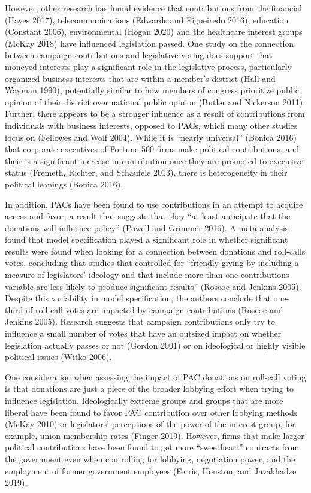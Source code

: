 \documentclass[12pt,]{article}
\begin{document}
However, other research has found evidence that contributions from the
financial (Hayes 2017), telecommunications (Edwards and Figueiredo
2016), education (Constant 2006), environmental (Hogan 2020) and the
healthcare interest groups (McKay 2018) have influenced legislation
passed. One study on the connection between campaign contributions and
legislative voting does support that moneyed interests play a
significant role in the legislative process, particularly organized
business interests that are within a member's district (Hall and Wayman
1990), potentially similar to how members of congress prioritize public
opinion of their district over national public opinion (Butler and
Nickerson 2011). Further, there appears to be a stronger influence as a
result of contributions from individuals with business interests,
opposed to PACs, which many other studies focus on (Fellowes and Wolf
2004). While it is ``nearly universal'' (Bonica 2016) that corporate
executives of Fortune 500 firms make political contributions, and their
is a significant increase in contribution once they are promoted to
executive status (Fremeth, Richter, and Schaufele 2013), there is
heterogeneity in their political leanings (Bonica 2016).

In addition, PACs have been found to use contributions in an attempt to
acquire access and favor, a result that suggests that they ``at least
anticipate that the donations will influence policy'' (Powell and
Grimmer 2016). A meta-analysis found that model specification played a
significant role in whether significant results were found when looking
for a connection between donations and roll-calls votes, concluding that
studies that controlled for ``friendly giving by including a measure of
legislators' ideology and that include more than one contributions
variable are less likely to produce significant results'' (Roscoe and
Jenkins 2005). Despite this variability in model specification, the
authors conclude that one-third of roll-call votes are impacted by
campaign contributions (Roscoe and Jenkins 2005). Research suggests that
campaign contributions only try to influence a small number of votes
that have an outsized impact on whether legislation actually passes or
not (Gordon 2001) or on ideological or highly visible political issues
(Witko 2006).

One consideration when assessing the impact of PAC donations on
roll-call voting is that donations are just a piece of the broader
lobbying effort when trying to influence legislation. Ideologically
extreme groups and groups that are more liberal have been found to favor
PAC contribution over other lobbying methods (McKay 2010) or
legislators' perceptions of the power of the interest group, for
example, union membership rates (Finger 2019). However, firms that make
larger political contributions have been found to get more
``sweetheart'' contracts from the government even when controlling for
lobbying, negotiation power, and the employment of former government
employees (Ferris, Houston, and Javakhadze 2019).
\end{document}
